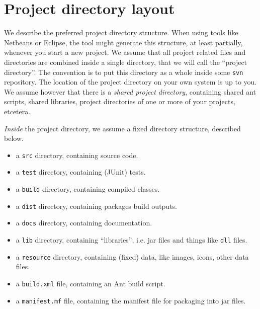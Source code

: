\section{Project directory layout}

We describe the preferred project directory structure. When using tools
like Netbeans or Eclipse, the tool might generate this structure, at least partially,
whenever you start a new project.
We assume that all project related files and directories are combined inside a single
directory, that we will call the ``project directory''.
The convention is to put this directory as a whole inside some \verb#svn# repository.
The location of the project directory on your own system is up to you.
We assume however that there is a \emph{shared project directory}, containing shared ant scripts,
shared libraries, project directories of one or more of your projects, etcetera.

\emph{Inside} the project directory, we assume a fixed directory structure, described below.
\begin{itemize}
\item a \verb#src# directory, containing source code.
\item a \verb#test# directory, containing (JUnit) tests.
\item a \verb#build# directory, containing compiled classes.
\item a \verb#dist# directory, containing packages build outputs.
\item a \verb#docs# directory, containing documentation.
\item a \verb#lib# directory, containing ``libraries'', i.e. jar files and things like \verb#dll# files.
\item a \verb#resource# directory, containing (fixed) data, like images, icons, other data files.

\item a \verb#build.xml# file, containing an Ant build script.
\item a \verb#manifest.mf# file, containing the manifest file for packaging into jar files.
\end{itemize}

